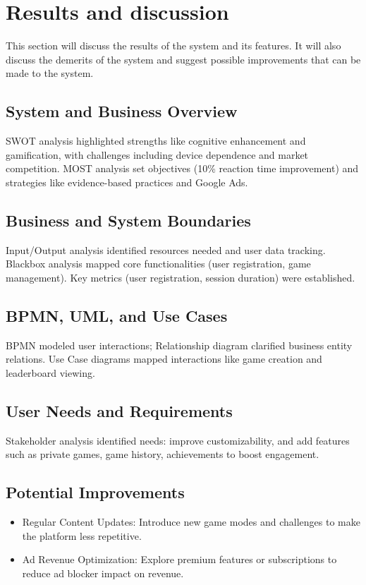 \documentclass[]{VUMIFTemplateClass}
\begin{document}
\section{Results and discussion}
\label{sec:results}
This section will discuss the results of the system and its features. It will also discuss the demerits of the system and suggest possible improvements that can be made to the system.

\subsection{System and Business Overview}
SWOT analysis highlighted strengths like cognitive enhancement and gamification, 
with challenges including device dependence and market competition. 
MOST analysis set objectives (10\% reaction time improvement) and strategies like evidence-based practices and Google Ads.

\subsection{Business and System Boundaries}
Input/Output analysis identified resources needed and user data tracking. Blackbox analysis mapped core functionalities (user registration, game management). Key metrics (user registration, session duration) were established.

\subsection{BPMN, UML, and Use Cases}
BPMN modeled user interactions; Relationship diagram clarified business entity relations. Use Case diagrams mapped interactions like game creation and leaderboard viewing.

\subsection{User Needs and Requirements}
Stakeholder analysis identified needs: improve customizability, and add features such as private games, game history, achievements to boost engagement.

\subsection{Potential Improvements}

\begin{itemize}
    \item Regular Content Updates: Introduce new game modes and challenges to make the platform less repetitive.
    \item Ad Revenue Optimization: Explore premium features or subscriptions to reduce ad blocker impact on revenue.
\end{itemize}
\end{document}
